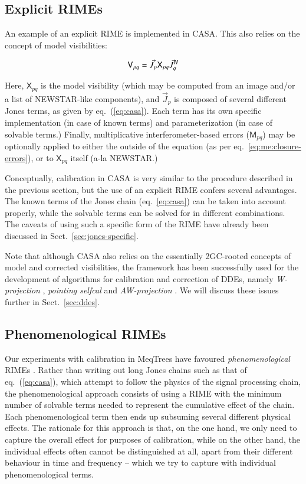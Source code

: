 \documentclass[]{aa}
\newcommand{\herm}{H}
\newcommand{\jones}[2]{\vec {#1}_{#2}}
\newcommand{\jonesT}[2]{\vec {#1}^{\herm}_{#2}}
\newcommand{\coh}[2]{\mathsf{{#1}}_{{#2}}}
\begin{document}
\subsection{Explicit RIMEs}

An example of an explicit RIME is implemented in CASA. This also relies on the concept of model visibilities:

\begin{equation}\label{eq:casa-rime}
\coh{V}{pq}  =  \jones{J}{p} \coh{X}{pq} \jonesT{J}{q} \\
\end{equation}

Here, $\coh{X}{pq}$ is the model visibility (which may be computed from an image and/or
a list of NEWSTAR-like components), and $\jones{J}{p}$ is composed of several different Jones terms, as given by eq.~(\ref{eq:casa}). Each term has its own specific implementation (in case of known terms) and parameterization (in case of solvable terms.) Finally, multiplicative interferometer-based errors ($\coh{M}{pq}$) may be optionally applied to either the outside of the equation (as per eq.~\ref{eq:me:closure-errors}), or to $\coh{X}{pq}$ itself (a-la NEWSTAR.) 

Conceptually, calibration in CASA is very similar to the procedure described in the previous section, but the use of an explicit RIME confers several advantages. The known terms of the Jones chain (eq.~\ref{eq:casa}) can be taken into account properly, while the solvable terms can be solved for in different combinations. The caveats of using such a specific form of the RIME have already been discussed in Sect.~\ref{sec:jones-specific}.

Note that although CASA also relies on the essentially 2GC-rooted concepts of model and corrected visibilities, the framework has been successfully used for the development of algorithms for calibration and correction of DDEs, namely \emph{W-projection} \citep{Cornwell:wproj}, \emph{pointing selfcal} \citep{SB:pointing} and \emph{AW-projection} \citep{SB:imageplane}. We will discuss these issues further in Sect.~\ref{sec:ddes}.

\subsection{\label{sec:phenomenological}Phenomenological RIMEs}

Our experiments with calibration in MeqTrees have favoured \emph{phenomenological} RIMEs \citep{meqtrees}. Rather than writing out long Jones chains such as that of eq.~(\ref{eq:casa}), which attempt to follow the physics of the signal processing chain, the phenomenological approach consists of using a RIME with the minimum number of solvable terms needed to represent the cumulative effect of the chain. Each phenomenological term then ends up subsuming several different physical effects. The rationale for this approach is that, on the one hand, we only need to capture the overall effect for purposes of calibration, while on the other hand, the individual effects often cannot be distinguished at all, apart from their different behaviour in time and frequency -- which we try to capture with individual phenomenological terms.
\end{document}
